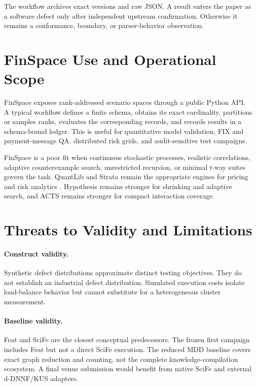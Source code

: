 \documentclass[10pt]{article}
\begin{document}
The workflow archives exact versions and raw JSON. A result enters the paper as a software defect only after independent upstream confirmation. Otherwise it remains a conformance, boundary, or parser-behavior observation.

\section{FinSpace Use and Operational Scope}
FinSpace exposes rank-addressed scenario spaces through a public Python API. A typical workflow defines a finite schema, obtains its exact cardinality, partitions or samples ranks, evaluates the corresponding records, and records results in a schema-bound ledger. This is useful for quantitative model validation, FIX and payment-message QA, distributed risk grids, and audit-sensitive test campaigns.

FinSpace is a poor fit when continuous stochastic processes, realistic correlations, adaptive counterexample search, unrestricted recursion, or minimal \(t\)-way suites govern the task. QuantLib and Strata remain the appropriate engines for pricing and risk analytics \cite{quantlib,strata}. Hypothesis remains stronger for shrinking and adaptive search, and ACTS remains stronger for compact interaction coverage.

\section{Threats to Validity and Limitations}
\paragraph{Construct validity.}
Synthetic defect distributions approximate distinct testing objectives. They do not establish an industrial defect distribution. Simulated execution costs isolate load-balance behavior but cannot substitute for a heterogeneous cluster measurement.

\paragraph{Baseline validity.}
Feat and SciFe are the closest conceptual predecessors. The frozen first campaign includes Feat but not a direct SciFe execution. The reduced MDD baseline covers exact graph reduction and counting, not the complete knowledge-compilation ecosystem. A final venue submission would benefit from native SciFe and external d-DNNF/KUS adapters.
\end{document}
